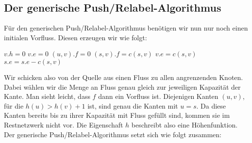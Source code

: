 \documentclass[12pt,a4paper,titlepage,onecolumn,ngerman,bibliography=totocnumbered]{scrartcl}
\theoremstyle{definition}
\theoremstyle{remark}
\newcommand{\pr}{Push/Relabel}
\begin{document}
\subsection{Der generische \pr -Algorithmus}
Für den generischen \pr -Algorithmus benötigen wir nun nur noch einen initialen Vorfluss.
Diesen erzeugen wir wie folgt:
\begin{algorithm}[H]
	\caption{Initialize-Preflow(G,s)}
	\label{alg:initialize_preflow}
	\begin{algorithmic}[1]
		\State $v.h = 0$
		\State $v.e = 0$
		\EndFor
		\State $(u,v).f = 0$
		\EndFor
		\State $(s,v).f = c(s,v)$
		\State $v.e = c(s,v)$
		\State $s.e = s.e - c(s,v)$
		\EndFor
	\end{algorithmic}
\end{algorithm}
Wir schicken also von der Quelle aus einen Fluss zu allen angrenzenden Knoten.
Dabei wählen wir die Menge an Fluss genau gleich zur jeweiligen Kapazität der Kante.
Man sieht leicht, dass $f$ dann ein Vorfluss ist.
Diejenigen Kanten $(u,v)$, für die $h(u) > h(v) + 1$ ist, sind genau die Kanten mit $u = s$.
Da diese Kanten bereits bis zu ihrer Kapazität mit Fluss gefüllt sind, kommen sie im Restnetzwerk nicht vor.
Die Eigenschaft $h$ beschreibt also eine Höhenfunktion.
\medbreak
Der generische \pr -Algorithmus setzt sich wie folgt zusammen:
\begin{algorithm}[H]
	\caption{Generic-\pr}
	\label{alg:generic_pr}
	\begin{algorithmic}[1]
		\EndWhile
	\end{algorithmic}
\end{algorithm}
\end{document}
